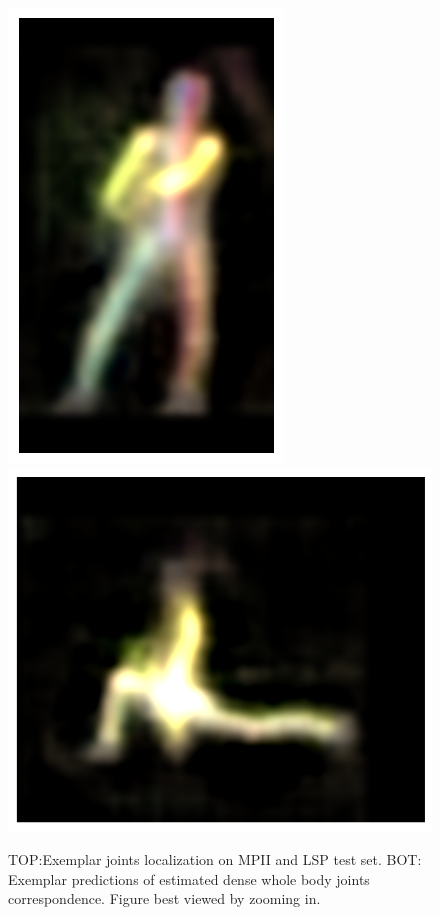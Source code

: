 \begin{figure}[t!]
    \includegraphics[height=\flowhh]{resources/Human_Poses/qualitative/svs-11}
    \hfill
    \includegraphics[height=\flowhh]{resources/Human_Poses/qualitative/svs-12}

    
    \caption{TOP:Exemplar joints localization on MPII and LSP test set. BOT: Exemplar predictions of estimated dense whole body joints correspondence. Figure best viewed by zooming in.}
    \label{fig:qualitative}
\end{figure}

